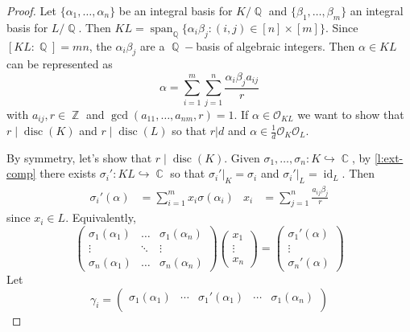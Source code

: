 \documentclass[11pt, a4paper]{memoir}
\DeclareMathOperator{\Q}{{\mathbb{Q}}}
\DeclareMathOperator{\Z}{{\mathbb{Z}}}
\DeclareMathOperator{\C}{{\mathbb{C}}}
\newcommand{\hto}[0]{\ensuremath{\hookrightarrow}}
\theoremstyle{change}
\theoremstyle{plain}
\theoremstyle{nonumberplain}
\newtheorem{proof}{Proof}
\DeclareMathOperator{\disc}{disc}
\DeclareMathOperator{\id}{id}
\DeclareMathOperator{\spn}{span}
\numberwithin{equation}{section}
\begin{document}
\begin{proof}
    Let $\{\alpha_1,\ldots,\alpha_n\}$ be an integral basis for $K/\Q$ and $\{\beta_1,\ldots,\beta_m\}$ an integral basis for $L/\Q$.
    Then $KL=\spn_{\Q}\{\alpha_i\beta_j:(i,j)\in[n]\times[m]\}$.
    Since $[KL:\Q]=mn$, the $\alpha_i\beta_j$ are a $\Q-$basis of algebraic integers.
    Then $\alpha\in KL$ can be represented as
    \begin{equation*}
        \alpha=\sum\limits_{i=1}^m\sum\limits_{j=1}^n\frac{\alpha_i\beta_ja_{ij}}{r}
    \end{equation*}
    with $a_{ij},r\in\Z$ and $\gcd(a_{11},\ldots,a_{nm},r)=1$.
    If $\alpha\in\mathcal{O}_{KL}$ we want to show that $r\mid\disc(K)$ and $r\mid\disc(L)$ so that $r|d$ and $\alpha\in\frac{1}{d}\mathcal{O}_K\mathcal{O}_L$.
    
    By symmetry, let's show that $r\mid\disc(K)$.
    Given $\sigma_1,\ldots,\sigma_n:K\hto\C$, by \cref{l:ext-comp} there exists $\sigma_i':KL\hto\C$ so that $\sigma_i'|_K=\sigma_i$ and $\sigma_i'|_L=\id_L$.
    Then
    \begin{align*}
        \sigma_i'(\alpha)&= \sum\limits_{i=1}^m x_i\sigma(\alpha_i)& x_i&=\sum\limits_{j=1}^n\frac{a_{ij}\beta_j}{r}
    \end{align*}
    since $x_i\in L$.
    Equivalently,
    \begin{equation*}
        \begin{pmatrix}
            \sigma_1(\alpha_1)&\hdots&\sigma_1(\alpha_n)\\
            \vdots&\ddots&\vdots\\
            \sigma_n(\alpha_1)&\hdots&\sigma_n(\alpha_n)
        \end{pmatrix}
        \begin{pmatrix}
            x_1\\\vdots\\x_n
        \end{pmatrix}
        =
        \begin{pmatrix}
            \sigma_1'(\alpha)\\\vdots\\\sigma_n'(\alpha)
        \end{pmatrix}
    \end{equation*}
    Let
    \begin{equation*}
        \gamma_i=
        \begin{pmatrix}
            \sigma_1(\alpha_1)&\cdots&\sigma_1'(\alpha_1)&\cdots&\sigma_1(\alpha_n)\\

\end{pmatrix}
\end{equation*}
\end{proof}
\end{document}
